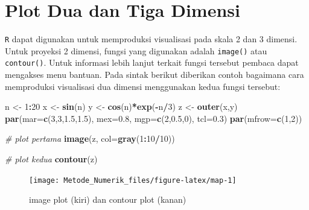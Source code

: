 \documentclass[
]{book}
\newenvironment{Shaded}{\begin{snugshade}}{\end{snugshade}}
\newcommand{\AttributeTok}[1]{\textcolor[rgb]{0.13,0.29,0.53}{#1}}
\newcommand{\CommentTok}[1]{\textcolor[rgb]{0.56,0.35,0.01}{\textit{#1}}}
\newcommand{\DecValTok}[1]{\textcolor[rgb]{0.00,0.00,0.81}{#1}}
\newcommand{\FloatTok}[1]{\textcolor[rgb]{0.00,0.00,0.81}{#1}}
\newcommand{\FunctionTok}[1]{\textcolor[rgb]{0.13,0.29,0.53}{\textbf{#1}}}
\newcommand{\NormalTok}[1]{#1}
\newcommand{\OtherTok}[1]{\textcolor[rgb]{0.56,0.35,0.01}{#1}}
\newcommand{\SpecialCharTok}[1]{\textcolor[rgb]{0.81,0.36,0.00}{\textbf{#1}}}
\theoremstyle{definition}
\theoremstyle{definition}
\theoremstyle{definition}
\theoremstyle{definition}
\theoremstyle{remark}
\begin{document}
\hypertarget{plot-dua-dan-tiga-dimensi}{%
\section{Plot Dua dan Tiga Dimensi}\label{plot-dua-dan-tiga-dimensi}}

\texttt{R} dapat digunakan untuk memproduksi visualisasi pada skala 2 dan 3 dimensi. Untuk proyeksi 2 dimensi, fungsi yang digunakan adalah \texttt{image()} atau \texttt{contour()}. Untuk informasi lebih lanjut terkait fungsi tersebut pembaca dapat mengakses menu bantuan. Pada sintak berikut diberikan contoh bagaimana cara memproduksi visualisasi dua dimensi menggunakan kedua fungsi tersebut:

\begin{Shaded}
\begin{Highlighting}[]
\NormalTok{n }\OtherTok{\textless{}{-}} \DecValTok{1}\SpecialCharTok{:}\DecValTok{20}
\NormalTok{x }\OtherTok{\textless{}{-}} \FunctionTok{sin}\NormalTok{(n)}
\NormalTok{y }\OtherTok{\textless{}{-}} \FunctionTok{cos}\NormalTok{(n)}\SpecialCharTok{*}\FunctionTok{exp}\NormalTok{(}\SpecialCharTok{{-}}\NormalTok{n}\SpecialCharTok{/}\DecValTok{3}\NormalTok{)}
\NormalTok{z }\OtherTok{\textless{}{-}} \FunctionTok{outer}\NormalTok{(x,y)}
\FunctionTok{par}\NormalTok{(}\AttributeTok{mar=}\FunctionTok{c}\NormalTok{(}\DecValTok{3}\NormalTok{,}\DecValTok{3}\NormalTok{,}\FloatTok{1.5}\NormalTok{,}\FloatTok{1.5}\NormalTok{), }\AttributeTok{mex=}\FloatTok{0.8}\NormalTok{, }\AttributeTok{mgp=}\FunctionTok{c}\NormalTok{(}\DecValTok{2}\NormalTok{,}\FloatTok{0.5}\NormalTok{,}\DecValTok{0}\NormalTok{), }\AttributeTok{tcl=}\FloatTok{0.3}\NormalTok{)}
\FunctionTok{par}\NormalTok{(}\AttributeTok{mfrow=}\FunctionTok{c}\NormalTok{(}\DecValTok{1}\NormalTok{,}\DecValTok{2}\NormalTok{))}

\CommentTok{\# plot pertama}
\FunctionTok{image}\NormalTok{(z, }\AttributeTok{col=}\FunctionTok{gray}\NormalTok{(}\DecValTok{1}\SpecialCharTok{:}\DecValTok{10}\SpecialCharTok{/}\DecValTok{10}\NormalTok{))}

\CommentTok{\# plot kedua}
\FunctionTok{contour}\NormalTok{(z)}
\end{Highlighting}
\end{Shaded}

\begin{figure}

{\centering \texttt{[image: Metode\_Numerik\_files/figure-latex/map-1]} 

}

\caption{image plot (kiri) dan contour plot (kanan)}\label{fig:map}
\end{figure}
\end{document}
